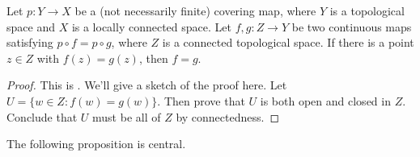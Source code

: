 \begin{proposition*}
\label{prop:if two maps agree on a point then they are equal from szamuely}
Let $p : Y \to X$ be a (not necessarily finite) covering map, where $Y$ is a topological space and $X$ is a locally connected space. Let $f,g : Z \to Y$ be two continuous maps satisfying $p \circ f= p \circ g$, where $Z$ is a connected topological space. If there is a point $z \in Z$ with $f(z) = g(z)$, then $f=g$.
\end{proposition*}
\begin{proof}
This is \cite[Proposition 2.2.2]{szamuely}. We'll give a sketch of the proof here. Let $U = \{w \in Z : f(w) = g(w)\}$. Then prove that $U$ is both open and closed in $Z$. Conclude that $U$ must be all of $Z$ by connectedness.
\end{proof}

The following proposition is central.


